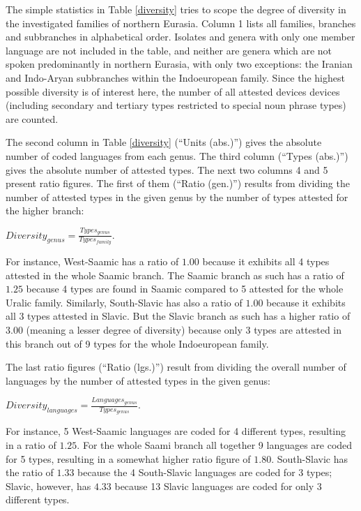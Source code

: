 The simple statistics in Table \ref{diversity} tries to scope the degree of diversity in the investigated families of northern Eurasia. Column 1 lists all families, branches and subbranches in alphabetical order. Isolates and genera with only one member language are not included in the table, and neither are genera which are not spoken predominantly in northern Eurasia, with only two exceptions: the Iranian and Indo-Aryan subbranches within the Indoeuropean family. Since the highest possible diversity is of interest here, the number of all attested devices devices (including secondary and tertiary types restricted to special noun phrase types) are counted. 

The second column in Table \ref{diversity} (“Units (abs.)”) gives the absolute number of coded languages from each genus. The third column (“Types (abs.)”) gives the absolute number of attested types. The next two columns 4 and 5 present ratio figures. The first of them  (“Ratio (gen.)”) results from dividing the number of attested types in the given genus by the number of types attested for the higher branch:\medskip

$Diversity_{genus} = \frac{Types_{genus}}{Types_{family}}$.\medskip

\noindent For instance, West-Saamic has a ratio of $1.00$ because it exhibits all 4 types attested in the whole Saamic branch. The Saamic branch as such has a ratio of $1.25$ because 4 types are found in Saamic compared to 5 attested for the whole Uralic family. Similarly, South-Slavic has also a ratio of $1.00$ because it exhibits all 3 types attested in Slavic. But the Slavic branch as such has a higher ratio of $3.00$ (meaning a lesser degree of diversity) because only 3 types are attested in this branch out of 9 types for the whole Indoeuropean family. 

The last ratio figures (“Ratio (lgs.)”) result from dividing the overall number of languages by the number of attested types in the given genus:\medskip

$Diversity_{languages} = \frac{Languages_{genus}}{Types_{genus}}$.\medskip

\noindent For instance, 5 West-Saamic languages are coded for 4 different types, resulting in a ratio of $1.25$. For the whole Saami branch all together 9 languages are coded for 5 types, resulting in a somewhat higher ratio figure of $1.80$. South-Slavic has the ratio of $1.33$ because the 4 South-Slavic languages are coded for 3 types; Slavic, however, has $4.33$ because 13 Slavic languages are coded for only 3 different types.

